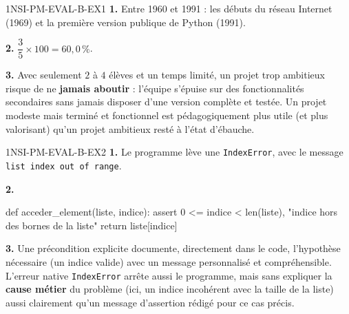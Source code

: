 \begin{corrige}{1NSI-PM-EVAL-B-EX1}
\textbf{1.} Entre 1960 et 1991 : les débuts du réseau Internet (1969) et la première
version publique de Python (1991).

\textbf{2.} $\dfrac{3}{5}\times100=60{,}0\,\%$.

\textbf{3.} Avec seulement $2$ à $4$ élèves et un temps limité, un projet trop ambitieux
risque de ne \textbf{jamais aboutir} : l'équipe s'épuise sur des fonctionnalités
secondaires sans jamais disposer d'une version complète et testée. Un projet modeste mais
terminé et fonctionnel est pédagogiquement plus utile (et plus valorisant) qu'un projet
ambitieux resté à l'état d'ébauche.
\end{corrige}

\begin{corrige}{1NSI-PM-EVAL-B-EX2}
\textbf{1.} Le programme lève une \lstinline{IndexError}, avec le message
\lstinline{list index out of range}.

\textbf{2.}
\begin{python}
def acceder_element(liste, indice):
    assert 0 <= indice < len(liste), "indice hors des bornes de la liste"
    return liste[indice]
\end{python}

\textbf{3.} Une précondition explicite documente, directement dans le code, l'hypothèse
nécessaire (un indice valide) avec un message personnalisé et compréhensible. L'erreur
native \lstinline{IndexError} arrête aussi le programme, mais sans expliquer la
\textbf{cause métier} du problème (ici, un indice incohérent avec la taille de la liste)
aussi clairement qu'un message d'assertion rédigé pour ce cas précis.
\end{corrige}
